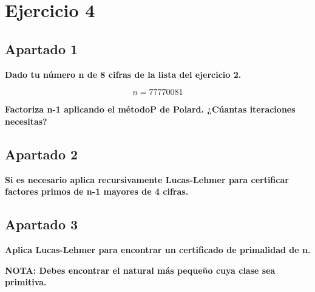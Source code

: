 \documentclass[a4paper]{article}
\title {\fbox{\Huge{\textbf{Ejercicio 4}}}}
\author {\fbox{Ana Buendía Ruiz-Azuaga}}
\begin{document}
\maketitle


\section{Ejercicio 4}
\subsection{Apartado 1}
\textbf{Dado tu número n de 8 cifras de la lista del ejercicio 2.}

$$n = 77770081$$

\textbf{Factoriza n-1 aplicando el métodoΡ de Polard. ¿Cúantas iteraciones necesitas?}



\subsection{Apartado 2}
\textbf{Si es necesario aplica recursivamente Lucas-Lehmer para certificar factores primos de n-1 mayores de 4 cifras.}


\subsection{Apartado 3}

\textbf{Aplica Lucas-Lehmer para encontrar un certificado de primalidad de n.}

\textbf{NOTA: Debes encontrar el natural más pequeño cuya clase sea primitiva.}
\end{document}

